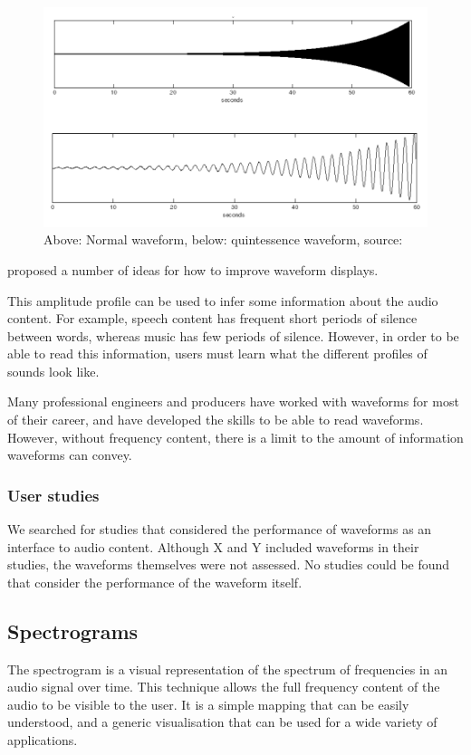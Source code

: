 \begin{figure}[p]
  \centering
  \includegraphics[width=0.95\linewidth]{figs/quint.png}
  \caption{Above: Normal waveform, below: quintessence waveform, source:
  \citep{Loviscach2011}}
  \label{fig:quint}
\end{figure}

\citet{Gohlke2010} proposed a number of ideas for how to improve waveform displays.

This amplitude profile can be used to infer some information about the audio content. For example, speech content has
frequent short periods of silence between words, whereas music has few periods of silence. However, in order to be able
to read this information, users must learn what the different profiles of sounds look like.

Many professional engineers and producers have worked with waveforms for most of their career, and have developed the
skills to be able to read waveforms.  However, without frequency content, there is a limit to the amount of information
waveforms can convey.

\subsubsection{User studies}

We searched for studies that considered the performance of waveforms as an interface to audio content. Although X and Y
included waveforms in their studies, the waveforms themselves were not assessed. No studies could be found that
consider the performance of the waveform itself.

\subsection{Spectrograms}
The spectrogram is a visual representation of the spectrum of frequencies in an audio signal over time.  This technique
allows the full frequency content of the audio to be visible to the user. It is a simple mapping that can be easily
understood, and a generic visualisation that can be used for a wide variety of applications.

